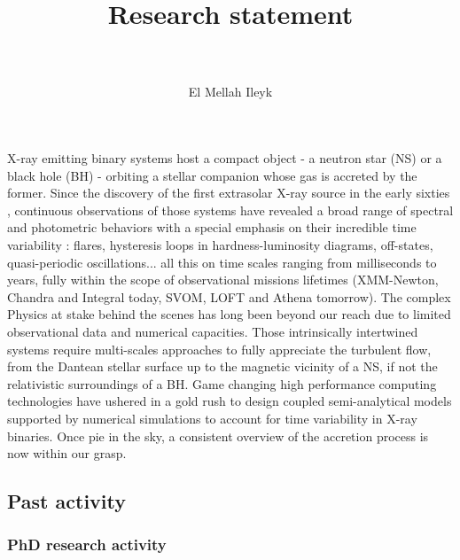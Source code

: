 \documentclass[a4paper,12pt,onecolumn]{article}
\title{	
\vspace*{-2cm}
\normalfont \tiny 
\horrule{0.5pt} \\[0.4cm] %
\huge Research statement \\ %
\horrule{2pt} \\[0.5cm] %
}
\author{El Mellah Ileyk} %
\date{\tiny }%
\begin{document}


\maketitle
\thispagestyle{empty}

X-ray emitting binary systems host a compact object - a neutron star (NS) or a black hole (BH) - orbiting a stellar companion whose gas is accreted by the former. Since the discovery of the first extrasolar X-ray source in the early sixties \citep{Giacconi1962}, continuous observations of those systems have revealed a broad range of spectral and photometric behaviors with a special emphasis on their incredible time variability : flares, hysteresis loops in hardness-luminosity diagrams, off-states, quasi-periodic oscillations... all this on time scales ranging from milliseconds to years, fully within the scope of observational missions lifetimes (XMM-Newton, Chandra and Integral today, SVOM, LOFT and Athena tomorrow). The complex Physics at stake behind the scenes has long been beyond our reach due to limited observational data and numerical capacities. Those intrinsically intertwined systems require multi-scales approaches to fully appreciate the turbulent flow, from the Dantean stellar surface up to the magnetic vicinity of a NS, if not the relativistic surroundings of a BH. Game changing high performance computing technologies have ushered in a gold rush to design coupled semi-analytical models supported by numerical simulations to account for time variability in X-ray binaries. Once pie in the sky, a consistent overview of the accretion process is now within our grasp.

\subsection*{Past activity}

\subsubsection*{PhD research activity}
\end{document}

